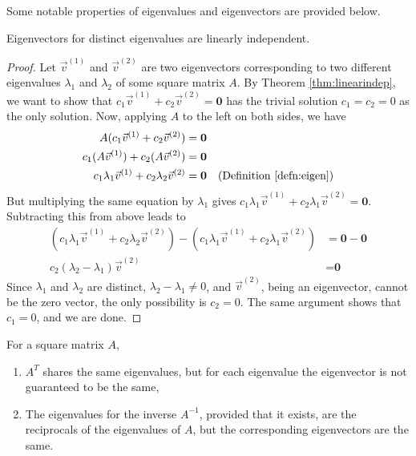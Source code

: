 Some notable properties of eigenvalues and eigenvectors are provided below.
\begin{proper}
\label{proper:eigenlinind}
Eigenvectors for distinct eigenvalues are linearly independent.
\end{proper}
\begin{proof}
Let $\vec{v}^{(1)}$ and $\vec{v}^{(2)}$ are two eigenvectors corresponding to two different eigenvalues $\lambda_1$ and $\lambda_2$ of some square matrix $A$. By Theorem \ref{thm:linearindep}, we want to show that $c_1\vec{v}^{(1)} + c_2\vec{v}^{(2)} = \textbf{0}$ has the trivial solution $c_1 = c_2 = 0$ as the only solution. Now, applying $A$ to the left on both sides, we have
\begin{align*}
A(c_1\vec{v}^{(1)} + c_2\vec{v}^{(2)}) &= \textbf{0} \\
c_1(A\vec{v}^{(1)}) + c_2(A\vec{v}^{(2)}) &= \textbf{0} \\
c_1\lambda_1\vec{v}^{(1)} + c_2\lambda_2\vec{v}^{(2)} &= \textbf{0} & \text{(Definition \ref{defn:eigen})}
\end{align*}
But multiplying the same equation by $\lambda_1$ gives $c_1\lambda_1\vec{v}^{(1)} + c_2\lambda_1\vec{v}^{(2)} = \textbf{0}$. Subtracting this from above leads to
\begin{align*}
(c_1\lambda_1\vec{v}^{(1)} + c_2\lambda_2\vec{v}^{(2)}) - (c_1\lambda_1\vec{v}^{(1)} + c_2\lambda_1\vec{v}^{(2)}) &= \textbf{0} - \textbf{0} \\
c_2(\lambda_2-\lambda_1)\vec{v}^{(2)} &= \textbf{0}
\end{align*}
Since $\lambda_1$ and $\lambda_2$ are distinct, $\lambda_2-\lambda_1 \neq 0$, and $\vec{v}^{(2)}$, being an eigenvector, cannot be the zero vector, the only possibility is $c_2 = 0$. The same argument shows that $c_1 = 0$, and we are done.
\end{proof}
\begin{proper}
For a square matrix $A$,
\begin{enumerate}
\item $A^T$ shares the same eigenvalues, but for each eigenvalue the eigenvector is not guaranteed to be the same,
\item The eigenvalues for the inverse $A^{-1}$, provided that it exists, are the reciprocals of the eigenvalues of $A$, but the corresponding eigenvectors are the same.
\end{enumerate}
\end{proper}
